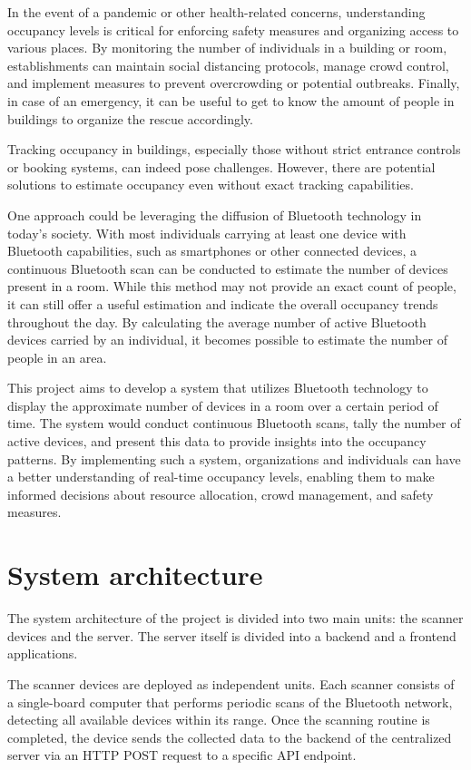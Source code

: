 \documentclass[a4paper, 11pt]{article}
\begin{document}
In the event of a pandemic or other health-related concerns, understanding occupancy levels is critical for enforcing safety measures and organizing access to various places. By monitoring the number of individuals in a building or room, establishments can maintain social distancing protocols, manage crowd control, and implement measures to prevent overcrowding or potential outbreaks. Finally, in case of an emergency, it can be useful to get to know the amount of people in buildings to organize the rescue accordingly.

Tracking occupancy in buildings, especially those without strict entrance controls or booking systems, can indeed pose challenges. However, there are potential solutions to estimate occupancy even without exact tracking capabilities.

One approach could be leveraging the diffusion of Bluetooth technology in today's society. With most individuals carrying at least one device with Bluetooth capabilities, such as smartphones or other connected devices, a continuous Bluetooth scan can be conducted to estimate the number of devices present in a room. While this method may not provide an exact count of people, it can still offer a useful estimation and indicate the overall occupancy trends throughout the day. By calculating the average number of active Bluetooth devices carried by an individual, it becomes possible to estimate the number of people in an area. 

This project aims to develop a system that utilizes Bluetooth technology to display the approximate number of devices in a room over a certain period of time. The system would conduct continuous Bluetooth scans, tally the number of active devices, and present this data to provide insights into the occupancy patterns. By implementing such a system, organizations and individuals can have a better understanding of real-time occupancy levels, enabling them to make informed decisions about resource allocation, crowd management, and safety measures.

\section{System architecture}
The system architecture of the project is divided into two main units: the scanner devices and the server. The server itself is divided into a backend and a frontend applications.

The scanner devices are deployed as independent units. Each scanner consists of a single-board computer that performs periodic scans of the Bluetooth network, detecting all available devices within its range. Once the scanning routine is completed, the device sends the collected data to the backend of the centralized server via an HTTP POST request to a specific API endpoint.
\end{document}
